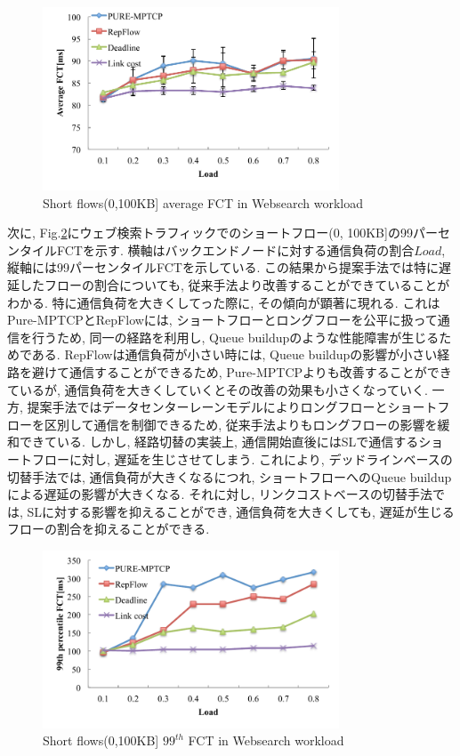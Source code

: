 \begin{figure}[t]
    \begin{center}
    \includegraphics[autoebb, width=250pt]{./img/websearch_avr.pdf}
    \caption{Short flows(0,100KB] average FCT in Websearch workload}
    \label{fig:websearch_FCT_ave}
    \end{center}
\end{figure}

次に, Fig.\ref{fig:websearch_FCT_tail}にウェブ検索トラフィックでのショートフロー(0,
100KB]の99パーセンタイルFCTを示す.
横軸はバックエンドノードに対する通信負荷の割合$Load$, 縦軸には99パーセンタイルFCTを示している. 
この結果から提案手法では特に遅延したフローの割合についても, 従来手法より改善することができていることがわかる. 
特に通信負荷を大きくしてった際に, その傾向が顕著に現れる. 
これはPure-MPTCPとRepFlowには, ショートフローとロングフローを公平に扱って通信を行うため, 同一の経路を利用し, Queue
buildupのような性能障害が生じるためである. 
RepFlowは通信負荷が小さい時には, Queue buildupの影響が小さい経路を避けて通信することができるため,
Pure-MPTCPよりも改善することができているが, 通信負荷を大きくしていくとその改善の効果も小さくなっていく. 
一方, 提案手法ではデータセンターレーンモデルによりロングフローとショートフローを区別して通信を制御できるため,
従来手法よりもロングフローの影響を緩和できている. 
しかし, 経路切替の実装上, 通信開始直後にはSLで通信するショートフローに対し, 遅延を生じさせてしまう. 
これにより, デッドラインベースの切替手法では, 通信負荷が大きくなるにつれ, ショートフローへのQueue buildupによる遅延の影響が大きくなる.
それに対し, リンクコストベースの切替手法では, SLに対する影響を抑えることができ, 通信負荷を大きくしても, 遅延が生じるフローの割合を抑えることができる. 


\begin{figure}[t]
    \begin{center}
    \includegraphics[autoebb, width=250pt]{./img/websearch_tail.pdf}
    \caption{Short flows(0,100KB] $99^{th}$ FCT in Websearch workload}
    \label{fig:websearch_FCT_tail}
    \end{center}
\end{figure}

